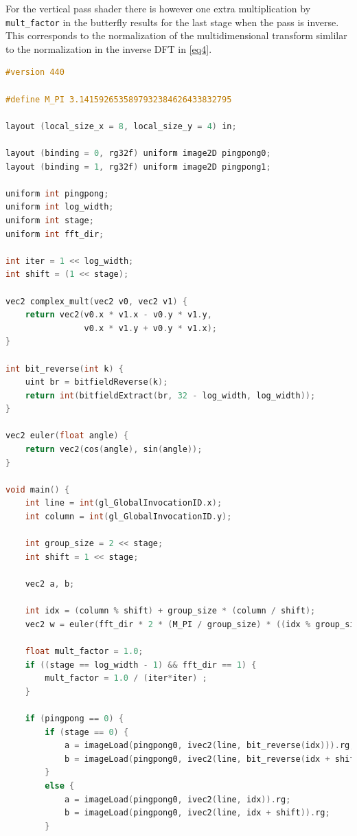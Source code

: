 \documentclass[
  oneside,
  11pt, a4paper,
  footinclude=true,
  headinclude=true,
  cleardoublepage=empty
]{scrbook}
\begin{document}
For the vertical pass shader there is however one extra multiplication by \texttt{mult\_factor} in the butterfly results for the last stage when the pass is inverse. This corresponds to the normalization of the multidimensional transform simlilar to the normalization in the inverse DFT in \autoref{eq4}.

\begin{lstlisting}[language=C,caption={FFT Cooley-Tukey Vertical},label={lst:ct-vertical}]
#version 440

#define M_PI 3.1415926535897932384626433832795

layout (local_size_x = 8, local_size_y = 4) in;

layout (binding = 0, rg32f) uniform image2D pingpong0;
layout (binding = 1, rg32f) uniform image2D pingpong1;

uniform int pingpong;
uniform int log_width;
uniform int stage;
uniform int fft_dir;

int iter = 1 << log_width;
int shift = (1 << stage);

vec2 complex_mult(vec2 v0, vec2 v1) {
	return vec2(v0.x * v1.x - v0.y * v1.y,
				v0.x * v1.y + v0.y * v1.x);
}

int bit_reverse(int k) {
    uint br = bitfieldReverse(k);
    return int(bitfieldExtract(br, 32 - log_width, log_width));
}

vec2 euler(float angle) {
	return vec2(cos(angle), sin(angle));
}

void main() {
	int line = int(gl_GlobalInvocationID.x);
	int column = int(gl_GlobalInvocationID.y);

	int group_size = 2 << stage;
	int shift = 1 << stage;

	vec2 a, b;

    int idx = (column % shift) + group_size * (column / shift);
    vec2 w = euler(fft_dir * 2 * (M_PI / group_size) * ((idx % group_size) % shift));

    float mult_factor = 1.0;
    if ((stage == log_width - 1) && fft_dir == 1) {
        mult_factor = 1.0 / (iter*iter) ;
    }

    if (pingpong == 0) {
        if (stage == 0) {
            a = imageLoad(pingpong0, ivec2(line, bit_reverse(idx))).rg;
            b = imageLoad(pingpong0, ivec2(line, bit_reverse(idx + shift))).rg;
        }
        else {
            a = imageLoad(pingpong0, ivec2(line, idx)).rg;
            b = imageLoad(pingpong0, ivec2(line, idx + shift)).rg;
        }
        

\end{lstlisting}
\end{document}
